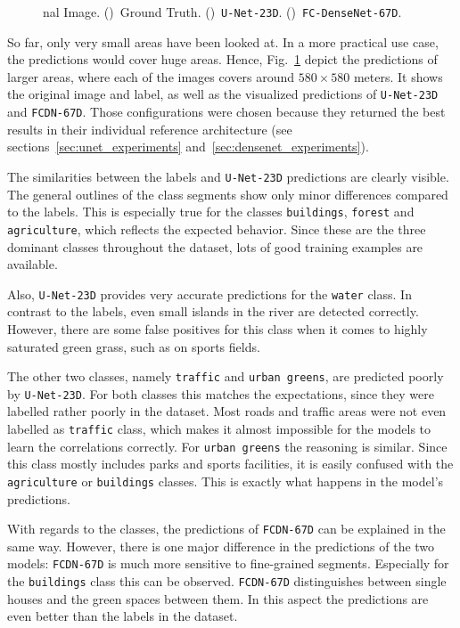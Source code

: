 \begin{figure}[h]
{nal Image.
    ()~Ground Truth.
    ()~\texttt{U-Net-23D}.
    ()~\texttt{FC-DenseNet-67D}.
    }
    \label{fig:segmentation_discussion}
\end{figure}

So far, only very small areas have been looked at. In a more practical use case, the predictions would cover huge areas. Hence, Fig.~\ref{fig:segmentation_discussion} depict the predictions of larger areas, where each of the images covers around $580\times 580$ meters. It shows the original image and label, as well as the visualized predictions of \texttt{U-Net-23D} and \texttt{FCDN-67D}. Those configurations were chosen because they returned the best results in their individual reference architecture (see sections~\ref{sec:unet_experiments} and~\ref{sec:densenet_experiments}).

The similarities between the labels and \texttt{U-Net-23D} predictions are clearly visible. The general outlines of the class segments show only minor differences compared to the labels. This is especially true for the classes \texttt{buildings}, \texttt{forest} and \texttt{agriculture}, which reflects the expected behavior. Since these are the three dominant classes throughout the dataset, lots of good training examples are available.

Also, \texttt{U-Net-23D} provides very accurate predictions for the \texttt{water} class. In contrast to the labels, even small islands in the river are detected correctly. However, there are some false positives for this class when it comes to highly saturated green grass, such as on sports fields.

The other two classes, namely \texttt{traffic} and \texttt{urban greens}, are predicted poorly by \texttt{U-Net-23D}. For both classes this matches the expectations, since they were labelled rather poorly in the dataset. Most roads and traffic areas were not even labelled as \texttt{traffic} class, which makes it almost impossible for the models to learn the correlations correctly. For \texttt{urban greens} the reasoning is similar. Since this class mostly includes parks and sports facilities, it is easily confused with the \texttt{agriculture} or \texttt{buildings} classes. This is exactly what happens in the model's predictions.

With regards to the classes, the predictions of \texttt{FCDN-67D} can be explained in the same way. However, there is one major difference in the predictions of the two models: \texttt{FCDN-67D} is much more sensitive to fine-grained segments. Especially for the \texttt{buildings} class this can be observed. \texttt{FCDN-67D} distinguishes between single houses and the green spaces between them. In this aspect the predictions are even better than the labels in the dataset.

